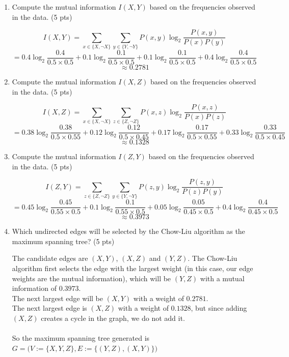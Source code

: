 \documentclass[a4paper]{article}
\theoremstyle{definition}
\newenvironment{soln}{
	\leavevmode\color{blue}\ignorespaces
}{}
\begin{document}
\begin{enumerate}
	\item Compute the mutual information $I(X, Y)$ based on the frequencies observed in the data. (5 pts)
	
	\begin{soln}
		$$I(X, Y) = \sum_{x \in \{X, \neg X\}} \sum_{y \in \{Y, \neg Y\}} P(x,y) \log_2 \frac{P(x,y)}{P(x) P(y)}$$
		$$ = 0.4 \log_2 \frac{0.4}{0.5 \times 0.5} + 0.1 \log_2 \frac{0.1}{0.5 \times 0.5} + 0.1 \log_2 \frac{0.1}{0.5 \times 0.5} + 0.4 \log_2 \frac{0.4}{0.5 \times 0.5}$$
		$$ \approx 0.2781$$
	\end{soln}
	
	\item Compute the mutual information $I(X, Z)$ based on the frequencies observed in the data. (5 pts)
	
	\begin{soln}
		$$I(X, Z) = \sum_{x \in \{X, \neg X\}} \sum_{z \in \{Z, \neg Z\}} P(x,z) \log_2 \frac{P(x,z)}{P(x) P(z)}$$
		$$ = 0.38 \log_2 \frac{0.38}{0.5 \times 0.55} + 0.12 \log_2 \frac{0.12}{0.5 \times 0.45} + 0.17 \log_2 \frac{0.17}{0.5 \times 0.55} + 0.33 \log_2 \frac{0.33}{0.5 \times 0.45}$$
		$$ \approx 0.1328$$
	\end{soln}
	
	\item Compute the mutual information $I(Z, Y)$ based on the frequencies observed in the data. (5 pts)
	
	\begin{soln}
		$$I(Z, Y) = \sum_{z \in \{Z, \neg Z\}} \sum_{y \in \{Y, \neg Y\}} P(z,y) \log_2 \frac{P(z,y)}{P(z) P(y)}$$
		$$ = 0.45 \log_2 \frac{0.45}{0.55 \times 0.5} + 0.1 \log_2 \frac{0.1}{0.55 \times 0.5} + 0.05 \log_2 \frac{0.05}{0.45 \times 0.5} + 0.4 \log_2 \frac{0.4}{0.45 \times 0.5}$$
		$$ \approx 0.3973$$
	\end{soln}
	
	\item Which undirected edges will be selected by the Chow-Liu algorithm as the maximum spanning tree? (5 pts)
	
	\begin{soln}
		The candidate edges are $(X, Y)$, $(X, Z)$ and $(Y, Z)$. The Chow-Liu algorithm first selects the edge with the largest weight (in this case, our edge weights are the mutual information), which will be $(Y, Z)$ with a mutual information of $0.3973$. \\
		The next largest edge will be $(X, Y)$ with a weight of $0.2781$. \\
		The next largest edge is $(X, Z)$ with a weight of $0.1328$, but since adding $(X, Z)$ creates a cycle in the graph, we do not add it. \\ \\
		So the maximum spanning tree generated is $G = \bigg(V := \{X, Y, Z\}, E := \{(Y, Z), (X, Y)\}\bigg)$
	\end{soln}


\end{enumerate}
\end{document}
